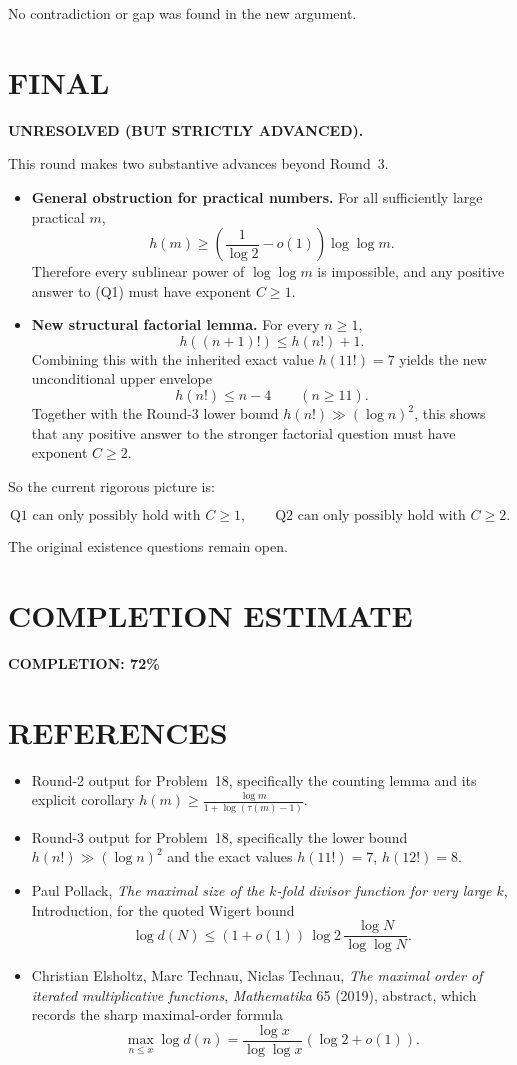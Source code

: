 No contradiction or gap was found in the new argument.

\section{FINAL}

\textbf{UNRESOLVED (BUT STRICTLY ADVANCED).}

This round makes two substantive advances beyond Round~3.

\begin{itemize}
\item \textbf{General obstruction for practical numbers.}
For all sufficiently large practical \(m\),
\[
h(m)\ge \left(\frac1{\log 2}-o(1)\right)\log\log m.
\]
Therefore every sublinear power of \(\log\log m\) is impossible, and any positive answer to (Q1) must have exponent \(C\ge 1\).

\item \textbf{New structural factorial lemma.}
For every \(n\ge 1\),
\[
h((n+1)!)\le h(n!)+1.
\]
Combining this with the inherited exact value \(h(11!)=7\) yields the new unconditional upper envelope
\[
h(n!)\le n-4\qquad (n\ge 11).
\]
Together with the Round-3 lower bound \(h(n!)\gg (\log n)^2\), this shows that any positive answer to the stronger factorial question must have exponent \(C\ge 2\).
\end{itemize}

So the current rigorous picture is:

\[
\boxed{\text{Q1 can only possibly hold with } C\ge 1,}
\qquad
\boxed{\text{Q2 can only possibly hold with } C\ge 2.}
\]

The original existence questions remain open.

\section{COMPLETION ESTIMATE}

\textbf{COMPLETION: 72\%}

\section{REFERENCES}

\begin{itemize}
\item Round-2 output for Problem~18, specifically the counting lemma and its explicit corollary \(h(m)\ge \frac{\log m}{1+\log(\tau(m)-1)}\).
\item Round-3 output for Problem~18, specifically the lower bound \(h(n!)\gg (\log n)^2\) and the exact values \(h(11!)=7\), \(h(12!)=8\).
\item Paul Pollack, \emph{The maximal size of the \(k\)-fold divisor function for very large \(k\)}, Introduction, for the quoted Wigert bound
\[
\log d(N)\le (1+o(1))\,\log 2\,\frac{\log N}{\log\log N}.
\]
\item Christian Elsholtz, Marc Technau, Niclas Technau, \emph{The maximal order of iterated multiplicative functions}, \emph{Mathematika} 65 (2019), abstract, which records the sharp maximal-order formula
\[
\max_{n\le x}\log d(n)=\frac{\log x}{\log\log x}(\log 2+o(1)).
\]
\end{itemize}

